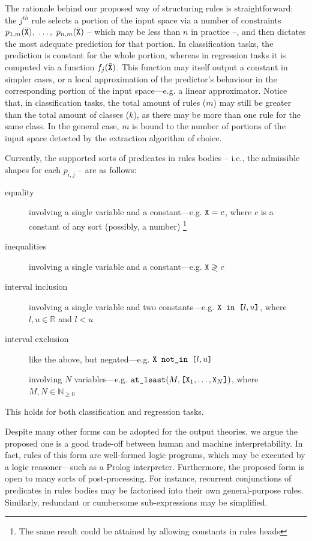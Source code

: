 \documentclass[12pt,a4paper,openright,twoside]{book}
\begin{document}
The rationale behind our proposed way of structuring rules is straightforward: the $j^{th}$ rule selects a portion of the input space via a number of constraints $p_{1,m}(\bar{\texttt{X}}),\ \ldots,\ \allowbreak p_{n,m}(\bar{\texttt{X}})$ -- which may be less than $n$ in practice --, and then dictates the most adequate prediction for that portion.
%
In classification tasks, the prediction is constant for the whole portion, whereas in regression tasks it is computed via a function $f_j(\bar{\texttt{X}})$.
%
This function may itself output a constant in simpler cases, or a local approximation of the predictor's behaviour in the corresponding portion of the input space---e.g. a linear approximator.
%
Notice that, in classification tasks, the total amount of rules ($m$) may still be greater than the total amount of classes ($k$), as there may be more than one rule for the same class. %
%
In the general case, $m$ is bound to the number of portions of the input space detected by the extraction algorithm of choice.

Currently, the supported sorts of predicates in rules bodies -- i.e., the admissible shapes for each $p_{i,j}$ -- are as follows:
%
\begin{description}
    \item[equality] involving a single variable and a constant---e.g. $\texttt{X} = c$, where $c$ is a constant of any sort (possibly, a number)
    \footnote{The same result could be attained by allowing constants in rules heads}
    \item[inequalities] involving a single variable and a constant---e.g. $\texttt{X} \gtrless c$
    \item[interval inclusion] involving a single variable and two constants---e.g. $\texttt{X} \texttt{ in [}l, u\texttt{]}$, where $l,u \in \mathbb{R}$ and $l < u$
    \item[interval exclusion] like the above, but negated---e.g. $\texttt{X} \texttt{ not\_in [}l, u\texttt{]}$
    \item[\mofn{}] involving $N$ variables---e.g. $\texttt{at\_least}(M, \allowbreak \texttt{[} \texttt{X}_1, \ldots, \texttt{X}_N \texttt{]})$, where $M, N \in \mathbb{N}_{\geq 0}$
\end{description}
%
This holds for both classification and regression tasks.

Despite many other forms can be adopted for the output theories, we argue the proposed one is a good trade-off between human and machine interpretability.
%
In fact, rules of this form are well-formed logic programs, which may be executed by a logic reasoner---such as a Prolog interpreter.
%
Furthermore, the proposed form is open to many sorts of post-processing.
%
For instance, recurrent conjunctions of predicates in rules bodies may be factorised into their own general-purpose rules.
%
Similarly, redundant or cumbersome sub-expressions may be simplified.
%
\end{document}
